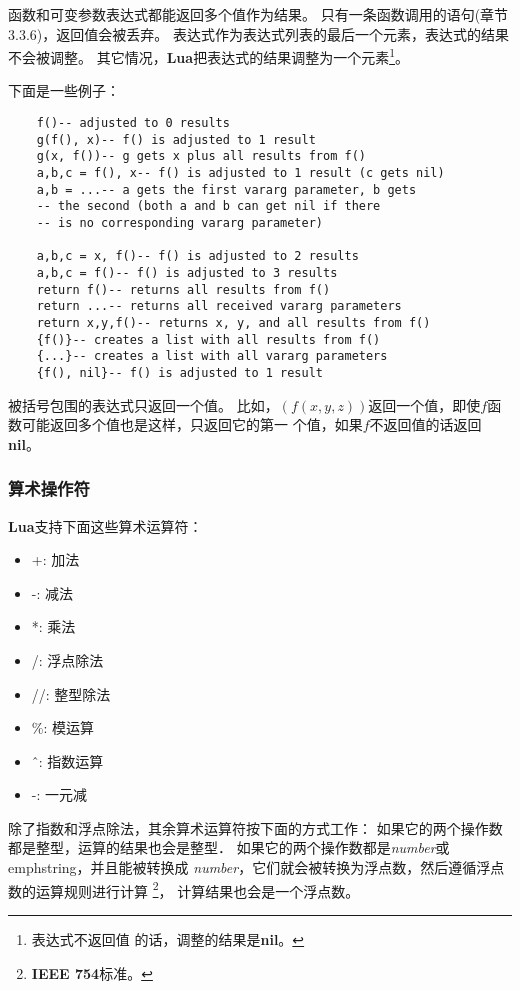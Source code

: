 \documentclass{ctexart}
\begin{document}
函数和可变参数表达式都能返回多个值作为结果。
只有一条函数调用的语句(章节3.3.6)，返回值会被丢弃。
表达式作为表达式列表的最后一个元素，表达式的结果不会被调整。
其它情况，\textbf{Lua}把表达式的结果调整为一个元素\footnote{表达式不返回值
的话，调整的结果是\textbf{nil}。}。

下面是一些例子：

\lstset{language=C}
\begin{lstlisting}
	f()-- adjusted to 0 results
	g(f(), x)-- f() is adjusted to 1 result
	g(x, f())-- g gets x plus all results from f()
	a,b,c = f(), x-- f() is adjusted to 1 result (c gets nil)
	a,b = ...-- a gets the first vararg parameter, b gets
	-- the second (both a and b can get nil if there
	-- is no corresponding vararg parameter)
     
	a,b,c = x, f()-- f() is adjusted to 2 results
	a,b,c = f()-- f() is adjusted to 3 results
	return f()-- returns all results from f()
	return ...-- returns all received vararg parameters
	return x,y,f()-- returns x, y, and all results from f()
	{f()}-- creates a list with all results from f()
	{...}-- creates a list with all vararg parameters
	{f(), nil}-- f() is adjusted to 1 result
\end{lstlisting}

被括号包围的表达式只返回一个值。
比如，$(f(x,y,z))$返回一个值，即使$f$函数可能返回多个值也是这样，只返回它的第一
个值，如果$f$不返回值的话返回\textbf{nil}。

\subsubsection{算术操作符}

\textbf{Lua}支持下面这些算术运算符：

\begin{itemize}
\item +: 加法
\item -: 减法
\item *: 乘法
\item /: 浮点除法
\item //: 整型除法
\item \%: 模运算
\item \^\ : 指数运算
\item -: 一元减
\end{itemize}

除了指数和浮点除法，其余算术运算符按下面的方式工作：
如果它的两个操作数都是整型，运算的结果也会是整型．
如果它的两个操作数都是\emph{number}或emph{string}，并且能被转换成
\emph{number}，它们就会被转换为浮点数，然后遵循浮点数的运算规则进行计算
\footnote{\textbf{IEEE 754}标准。}，
计算结果也会是一个浮点数。
\end{document}
